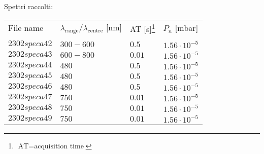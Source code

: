 Spettri raccolti:
\begin{center}
\begin{tabular}{p{3cm}p{4cm}p{2cm}p{3cm}}
\toprule
File name	&$\lambda_\text{range}\text{/}\lambda_\text{centre}$ [nm] &AT [s]\footnote{$\text{AT}=\text{acquisition time}$} &$P_{n}$ [$\si{\milli\bar}$]\\					&\\
\midrule
$2302speca42$	&$300-600$	&$0.5$		&$1.56\cdot10^{-5}$\\
$2302speca43$	&$600-800$	&$0.01$		&$1.56\cdot10^{-5}$\\
$2302speca44$	&$480$		&$0.5$		&$1.56\cdot10^{-5}$\\
$2302speca45$	&$480$		&$0.5$		&$1.56\cdot10^{-5}$\\
$2302speca46$	&$480$		&$0.5$		&$1.56\cdot10^{-5}$\\
$2302speca47$	&$750$		&$0.01$		&$1.56\cdot10^{-5}$\\
$2302speca48$	&$750$		&$0.01$		&$1.56\cdot10^{-5}$\\
$2302speca49$	&$750$		&$0.01$		&$1.56\cdot10^{-5}$\\
\bottomrule
\end{tabular}
\end{center}



